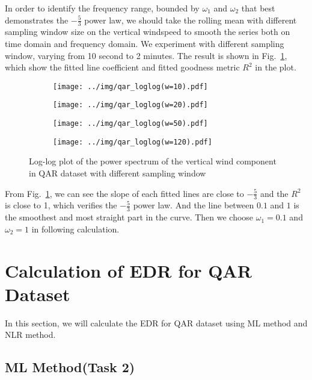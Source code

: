 \documentclass[runningheads]{llncs}
\begin{document}
In order to identify the frequency range, bounded by $\omega_1$ and $\omega_2$ that best demonstrates the $-\frac53$ power law,
we should take the rolling mean with different sampling window size on the vertical windspeed to smooth the series both on time domain and frequency domain. 
We experiment with different sampling window, varying from 10 second to 2 minutes. 
The result is shown in Fig.~\ref{fig:1},
which show the fitted line coefficient and fitted goodness metric $R^2$ in the plot.
\begin{figure}[!htbp]
    \centering
    \begin{subfigure}{.4\textwidth}
        \centering
        \texttt{[image: ../img/qar\_loglog(w=10).pdf]}  
    \end{subfigure}
    \begin{subfigure}{.4\textwidth}
        \centering
        \texttt{[image: ../img/qar\_loglog(w=20).pdf]}  
    \end{subfigure}
    \begin{subfigure}{.4\textwidth}
        \centering
        \texttt{[image: ../img/qar\_loglog(w=50).pdf]}  
    \end{subfigure}
    \begin{subfigure}{.4\textwidth}
        \centering
        \texttt{[image: ../img/qar\_loglog(w=120).pdf]}  
    \end{subfigure}
    \caption{Log-log plot of the power spectrum of the vertical wind component in QAR dataset with different sampling window}
    \label{fig:1}
\end{figure}

From Fig.~\ref{fig:1}, we can see the slope of each fitted lines are close to $-\frac53$ and the $R^2$ is close to 1, which verifies the $-\frac53$ power law.
And the line between $0.1$ and $1$ is the smoothest and most straight part in the curve.
Then we choose $\omega_1=0.1$ and $\omega_2=1$ in following calculation.

\section{Calculation of EDR for QAR Dataset}

In this section, we will calculate the EDR for QAR dataset using ML method and NLR method.

\subsection{ML Method(Task 2)}
\end{document}
